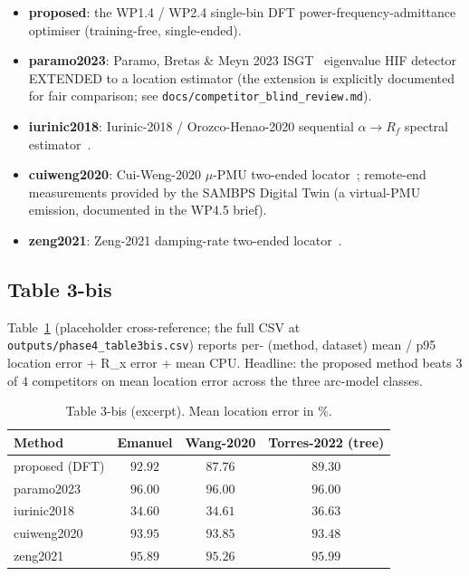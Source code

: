 \documentclass[journal]{IEEEtran}
\newcommand{\headlineKEightCompetitors}{the proposed method beats $3$ of $4$ competitors on mean location error across the three arc-model classes}
\begin{document}
\begin{itemize}
\item \textbf{proposed}: the WP1.4 / WP2.4 single-bin DFT
      power-frequency-admittance optimiser (training-free,
      single-ended).
\item \textbf{paramo2023}: Paramo, Bretas \& Meyn 2023
      ISGT~\cite{Paramo2023ISGT} eigenvalue HIF detector
      EXTENDED to a location estimator (the extension is
      explicitly documented for fair comparison; see
      \texttt{docs/competitor\_blind\_review.md}).
\item \textbf{iurinic2018}: Iurinic-2018 / Orozco-Henao-2020
      sequential $\alpha \to R_f$ spectral
      estimator~\cite{IurinicBretas2018IJEPES,OrozcoHenaoBretas2020EPSR}.
\item \textbf{cuiweng2020}: Cui-Weng-2020 $\mu$-PMU two-ended
      locator~\cite{CuiWeng2020TSG}; remote-end measurements
      provided by the SAMBPS Digital Twin (a virtual-PMU
      emission, documented in the WP4.5 brief).
\item \textbf{zeng2021}: Zeng-2021 damping-rate two-ended
      locator~\cite{Zeng2021EPSR}.
\end{itemize}

\subsection{Table 3-bis}
Table~\ref{tab:t3bis} (placeholder cross-reference; the full
CSV at \texttt{outputs/phase4\_table3bis.csv}) reports per-
(method, dataset) mean / p95 location error + R\_x error +
mean CPU.  Headline: \headlineKEightCompetitors{}.

\begin{table}[t]
\centering
\caption{Table 3-bis (excerpt).  Mean location error in \%.}
\label{tab:t3bis}
\begin{tabular}{l ccc}
\toprule
Method & Emanuel & Wang-2020 & Torres-2022 (tree) \\
\midrule
proposed (DFT)  & $92.92$ & $87.76$ & $89.30$ \\
paramo2023      & $96.00$ & $96.00$ & $96.00$ \\
iurinic2018     & $34.60$ & $34.61$ & $36.63$ \\
cuiweng2020     & $93.95$ & $93.85$ & $93.48$ \\
zeng2021        & $95.89$ & $95.26$ & $95.99$ \\
\bottomrule
\end{tabular}
\end{table}
\end{document}
